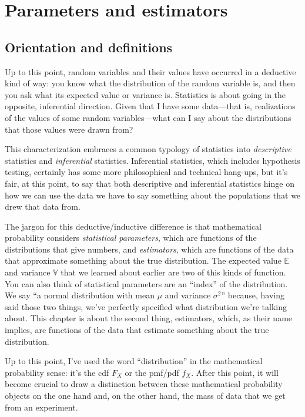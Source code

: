 
\chapter{Parameters and estimators}

\section{Orientation and definitions}

Up to this point, random variables and their values have occurred in a
deductive kind of way: you know what the distribution of the random variable
is, and then you ask what its expected value or variance is. Statistics is
about going in the opposite, inferential direction. Given that I have some data---that is,
realizations of the values of some random variables---what can I say about the
distributions that those values were drawn from?

This characterization embraces a common typology of statistics into
\emph{descriptive} statistics and \emph{inferential} statistics. Inferential
statistics, which includes hypothesis testing, certainly has some more
philosophical and technical hang-ups, but it's fair, at this point, to say
that both descriptive and inferential statistics hinge on how we can use the
data we have to say something about the populations that we drew that data
from.

The jargon for this deductive/inductive difference is that mathematical
probability considers \emph{statistical parameters}, which are functions of
the distributions that give numbers, and \emph{estimators}, which are
functions of the data that approximate something about the true distribution.
The expected value $\mathbb{E}$ and variance $\mathbb{V}$ that we learned
about earlier are two of this kinds of function. You can also think of
statistical parameters are an ``index'' of the distribution. We say ``a normal
distribution with mean $\mu$ and variance $\sigma^2$'' because, having said
those two things, we've perfectly specified what distribution we're talking
about. This chapter is about the second thing, estimators, which, as their
name implies, are functions of the data that estimate something about the true
distribution.

Up to this point, I've used the word ``distribution'' in the mathematical
probability sense: it's the cdf $F_X$ or the pmf/pdf $f_X$. After this point,
it will become crucial to draw a distinction between these mathematical
probability objects on the one hand and, on the other hand, the mass of data
that we get from an experiment.

